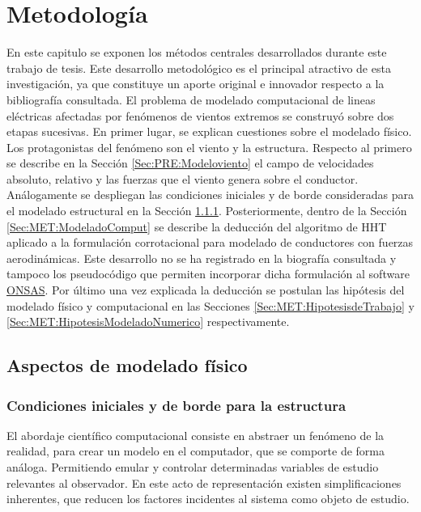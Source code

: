 \chapter{Metodología}\label{Cap:Metodologia}
\linenumbers

En este capitulo se exponen los métodos centrales desarrollados durante este trabajo de tesis. Este desarrollo metodológico es el principal atractivo de esta investigación, ya que constituye un aporte original e innovador respecto a la bibliografía consultada. El problema de modelado computacional de lineas eléctricas afectadas por fenómenos de vientos extremos se construyó sobre dos etapas sucesivas. En primer lugar, se explican cuestiones sobre el modelado físico. Los protagonistas del fenómeno son el viento y la estructura. Respecto al primero se describe  en la Sección \ref{Sec:PRE:Modeloviento} el campo de velocidades absoluto, relativo y las fuerzas que el viento genera sobre el conductor. Análogamente se despliegan las condiciones iniciales y de borde consideradas para el modelado estructural en la Sección \ref{Sec:MET:ModeladoEstructural}.  Posteriormente, dentro de la Sección \ref{Sec:MET:ModeladoComput} se describe la deducción del algoritmo de HHT aplicado a la formulación corrotacional para modelado de conductores con fuerzas aerodinámicas. Este desarrollo no se ha registrado en la biografía consultada y tampoco los pseudocódigo que permiten incorporar dicha formulación al software \href{https://github.com/ONSAS/ONSAS/}{ONSAS}. Por último una vez explicada la deducción se postulan las hipótesis del modelado físico y computacional en las Secciones \ref{Sec:MET:HipotesisdeTrabajo}  y \ref{Sec:MET:HipotesisModeladoNumerico} respectivamente. 

\section{Aspectos de modelado físico}
\subsection{Condiciones iniciales y de borde para la estructura}\label{Sec:MET:ModeladoEstructural}
El abordaje científico computacional consiste en abstraer un fenómeno de la realidad, para crear un modelo en el computador, que se comporte de forma análoga. Permitiendo emular y controlar determinadas variables de estudio relevantes al observador. En este acto de representación existen simplificaciones inherentes, que reducen los factores incidentes al sistema como objeto de estudio. 

